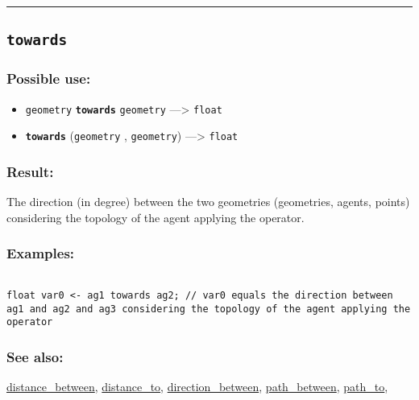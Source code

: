 \documentclass[]{book}
\providecommand{\tightlist}{%
  \setlength{\itemsep}{0pt}\setlength{\parskip}{0pt}}
\theoremstyle{definition}
\theoremstyle{definition}
\theoremstyle{definition}
\theoremstyle{remark}
\begin{document}
\begin{center}\rule{0.5\linewidth}{\linethickness}\end{center}

\subsection{\texorpdfstring{\texttt{towards}}{towards}}\label{towards}

\subsubsection{Possible use:}\label{possible-use-528}

\begin{itemize}
\tightlist
\item
  \texttt{geometry} \textbf{\texttt{towards}} \texttt{geometry}
  ---\textgreater{} \texttt{float}
\item
  \textbf{\texttt{towards}} (\texttt{geometry} , \texttt{geometry})
  ---\textgreater{} \texttt{float}
\end{itemize}

\subsubsection{Result:}\label{result-510}

The direction (in degree) between the two geometries (geometries,
agents, points) considering the topology of the agent applying the
operator.

\subsubsection{Examples:}\label{examples-365}

\begin{verbatim}
 
float var0 <- ag1 towards ag2; // var0 equals the direction between ag1 and ag2 and ag3 considering the topology of the agent applying the operator
\end{verbatim}

\subsubsection{See also:}\label{see-also-208}

\href{OperatorsDH\#distance_between}{distance\_between},
\href{OperatorsDH\#distance_to}{distance\_to},
\href{OperatorsDH\#direction_between}{direction\_between},
\href{OperatorsNR\#path_between}{path\_between},
\href{OperatorsNR\#path_to}{path\_to},
\end{document}
